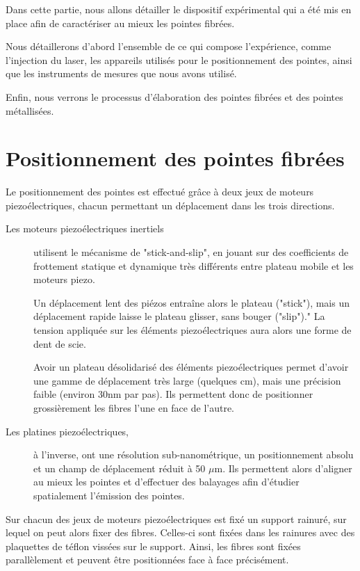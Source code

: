 Dans cette partie, nous allons détailler le dispositif expérimental qui a été mis en place afin de caractériser au mieux les pointes fibrées.

Nous détaillerons d'abord l'ensemble de ce qui compose l'expérience, comme l'injection du laser, les appareils utilisés pour le positionnement des pointes, ainsi que les instruments de mesures que nous avons utilisé.

Enfin, nous verrons le processus d'élaboration des pointes fibrées et des pointes métallisées.

\section{Positionnement des pointes fibrées}
Le positionnement des pointes est effectué grâce à deux jeux de moteurs piezoélectriques, chacun permettant un déplacement dans les trois directions.
\begin{description}
    \item[Les moteurs piezoélectriques inertiels\footnotemark] utilisent le mécanisme de "stick-and-slip", en jouant sur des coefficients de frottement statique et dynamique très différents entre plateau mobile et les moteurs piezo.

    Un déplacement lent des piézos entraîne alors le plateau ("stick"), mais un déplacement rapide laisse le plateau glisser, sans bouger ("slip")." La tension appliquée sur les éléments piezoélectriques aura alors une forme de dent de scie.

    Avoir un plateau désolidarisé des éléments piezoélectriques permet d'avoir une gamme de déplacement très large (quelques cm), mais une précision faible (environ 30nm par pas). Ils permettent donc de positionner grossièrement les fibres l'une en face de l'autre.

    \item[Les platines piezoélectriques\footnotemark,] à l'inverse, ont une résolution sub-nanométrique, un positionnement absolu et un champ de déplacement réduit à 50 $\mu$m. Ils permettent alors d'aligner au mieux les pointes et d'effectuer des balayages afin d'étudier spatialement l'émission des pointes.
\end{description}

Sur chacun des jeux de moteurs piezoélectriques est fixé un support rainuré, sur lequel on peut alors fixer des fibres. Celles-ci sont fixées dans les rainures avec des plaquettes de téflon vissées sur le support. Ainsi, les fibres sont fixées parallèlement et peuvent être positionnées face à face précisément.


